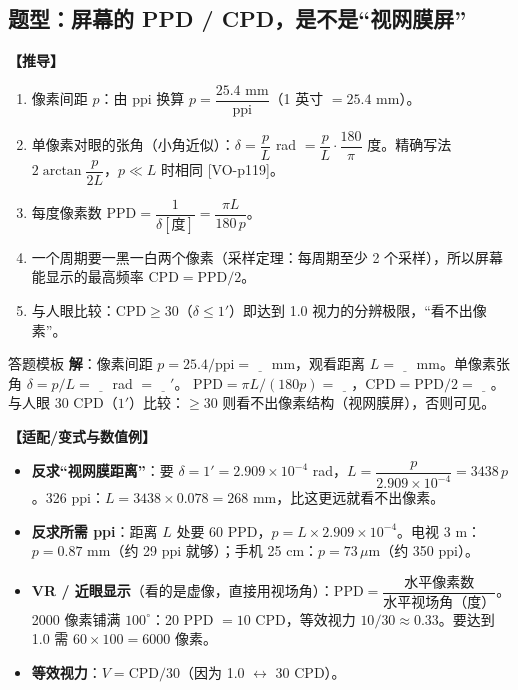 \subsection{题型：屏幕的 PPD / CPD，是不是“视网膜屏”}\label{sec:screencpd}
\textbf{【推导】}
\begin{enumerate}
\item 像素间距 $p$：由 ppi 换算 $p=\dfrac{25.4\text{ mm}}{\text{ppi}}$（1 英寸 $=25.4$ mm）。
\item 单像素对眼的张角（小角近似）：$\delta=\dfrac pL$ rad $=\dfrac pL\cdot\dfrac{180}{\pi}$ 度。精确写法 $2\arctan\dfrac{p}{2L}$，$p\ll L$ 时相同 [VO-p119]。
\item 每度像素数 $\mathrm{PPD}=\dfrac{1}{\delta[\text{度}]}=\dfrac{\pi L}{180\,p}$。
\item 一个周期要一黑一白两个像素（采样定理：每周期至少 2 个采样），所以屏幕能显示的最高频率 $\mathrm{CPD}=\mathrm{PPD}/2$。
\item 与人眼比较：$\mathrm{CPD}\ge30$（$\delta\le1'$）即达到 1.0 视力的分辨极限，“看不出像素”。
\end{enumerate}

\begin{exam}{答题模板}
\textbf{解}：像素间距 $p=25.4/\text{ppi}=\underline{\quad}$ mm，观看距离 $L=\underline{\quad}$ mm。单像素张角 $\delta=p/L=\underline{\quad}$ rad $=\underline{\quad}'$。
$\mathrm{PPD}=\pi L/(180p)=\underline{\quad}$，$\mathrm{CPD}=\mathrm{PPD}/2=\underline{\quad}$。
与人眼 30 CPD（$1'$）比较：$\ge30$ 则看不出像素结构（视网膜屏），否则可见。
\end{exam}

\textbf{【适配/变式与数值例】}
\begin{itemize}
\item \textbf{反求“视网膜距离”}：要 $\delta=1'=2.909\times10^{-4}$ rad，$L=\dfrac{p}{2.909\times10^{-4}}=3438\,p$。326 ppi：$L=3438\times0.078=268$ mm，比这更远就看不出像素。
\item \textbf{反求所需 ppi}：距离 $L$ 处要 60 PPD，$p=L\times2.909\times10^{-4}$。电视 3 m：$p=0.87$ mm（约 29 ppi 就够）；手机 25 cm：$p=73\,\mu$m（约 350 ppi）。
\item \textbf{VR / 近眼显示}（看的是虚像，直接用视场角）：$\mathrm{PPD}=\dfrac{\text{水平像素数}}{\text{水平视场角（度）}}$。2000 像素铺满 $100^\circ$：20 PPD $=10$ CPD，等效视力 $10/30\approx0.33$。要达到 1.0 需 $60\times100=6000$ 像素。
\item \textbf{等效视力}：$V=\mathrm{CPD}/30$（因为 1.0 $\leftrightarrow$ 30 CPD）。
\end{itemize}

